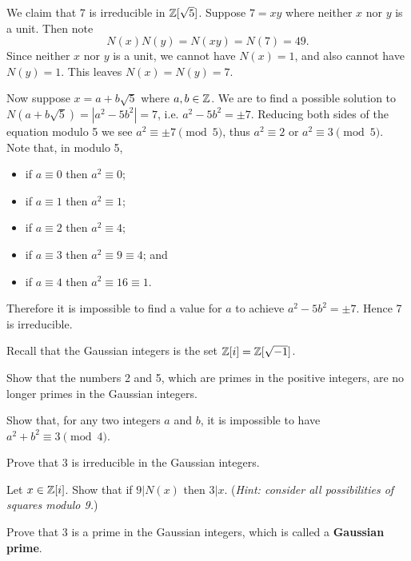 \begin{example}
    We claim that 7 is irreducible in $\mathbb{Z}[\sqrt{5}]$. Suppose $7 = xy$ where neither $x$ nor $y$ is a unit. Then note
    \[
        N(x)N(y) = N(xy) = N(7) = 49.
    \]
    Since neither $x$ nor $y$ is a unit, we cannot have $N(x) = 1$, and also cannot have $N(y) = 1$. This leaves $N(x) = N(y) = 7$.

    Now suppose $x = a + b\sqrt{5}$ where $a, b \in \mathbb{Z}$. We are to find a possible solution to $N(a+b\sqrt{5}) = |a^2 - 5b^2| = 7$, i.e. $a^2 - 5b^2 = \pm 7$. Reducing both sides of the equation modulo 5 we see $a^2 \equiv \pm7 \pmod5$, thus $a^2 \equiv 2$ or $a^2 \equiv 3 \pmod5$. Note that, in modulo 5,
    \begin{itemize}
        \item if $a \equiv 0$ then $a^2 \equiv 0$;
        \item if $a \equiv 1$ then $a^2 \equiv 1$;
        \item if $a \equiv 2$ then $a^2 \equiv 4$;
        \item if $a \equiv 3$ then $a^2 \equiv 9 \equiv 4$; and
        \item if $a \equiv 4$ then $a^2 \equiv 16 \equiv 1$.
    \end{itemize}
    Therefore it is impossible to find a value for $a$ to achieve $a^2 - 5b^2 = \pm7$. Hence 7 is irreducible.
\end{example}

\begin{exercise}
    Recall that the Gaussian integers is the set $\mathbb{Z}[i] = \mathbb{Z}[\sqrt{-1}]$.
    \begin{partquestions}{\alph*}
        \item Show that the numbers 2 and 5, which are primes in the positive integers, are no longer primes in the Gaussian integers.
        \item \begin{partquestions}{\roman*}
            \item Show that, for any two integers $a$ and $b$, it is impossible to have $a^2 + b^2 \equiv 3 \pmod4$.
            \item Prove that 3 is irreducible in the Gaussian integers.
            \item Let $x \in \mathbb{Z}[i]$. Show that if $9 \vert N(x)$ then $3 \vert x$.\newline
            (\textit{Hint: consider all possibilities of squares modulo 9.})
            \item Prove that 3 is a prime in the Gaussian integers, which is called a \textbf{Gaussian prime}.
        \end{partquestions}
    \end{partquestions}
\end{exercise}

